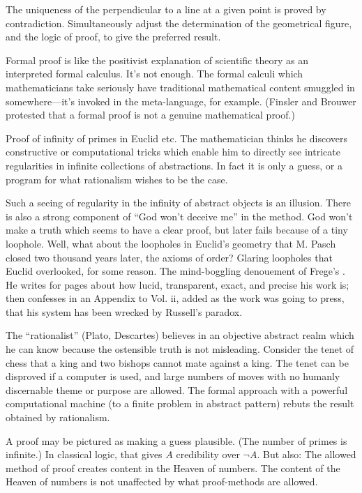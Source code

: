 The uniqueness of the perpendicular to a line at a given point is proved by contradiction. Simultaneously adjust the determination of the geometrical figure, and the logic of proof, to give the preferred result.

Formal proof is like the positivist explanation of scientific theory as an interpreted formal calculus. It's not enough. The formal calculi which mathematicians take seriously have traditional mathematical content smuggled in somewhere---it's invoked in the meta-language, for example. (Finsler and Brouwer protested that a formal proof is not a genuine mathematical proof.)

Proof of infinity of primes in Euclid etc. The mathematician thinks he discovers constructive or computational tricks which enable him to directly see intricate regularities in infinite collections of abstractions. In fact it is only a guess, or a program for what rationalism wishes to be the case.

Such a seeing of regularity in the infinity of abstract objects is an illusion. There is also a strong component of \enquote{God won't deceive me} in the method. God won't make a truth which seems to have a clear proof, but later fails because of a tiny loophole. Well, what about the loopholes in Euclid's geometry that M. Pasch closed two thousand years later, the axioms of order? Glaring loopholes that Euclid overlooked, for some reason. The mind-boggling denouement of Frege's . He writes for pages about how lucid, transparent, exact, and precise his work is; then confesses in an Appendix to Vol. ii, added as the work was going to press, that his system has been wrecked by Russell's paradox.

The \enquote{rationalist} (Plato, Descartes) believes in an objective abstract realm which he can know because the ostensible truth is not misleading. Consider the tenet of chess that a king and two bishops cannot mate against a king. The tenet can be disproved if a computer is used, and large numbers of moves with no humanly discernable theme or purpose are allowed. The formal approach with a powerful computational machine (to a finite problem in abstract pattern) rebuts the result obtained by rationalism.

A proof may be pictured as making a guess plausible. (The number of primes is infinite.) In classical logic, that gives $A$ credibility over $\lnot A$. But also: The allowed method of proof creates content in the Heaven of numbers. The content of the Heaven of numbers is not unaffected by what proof-methods are allowed.


